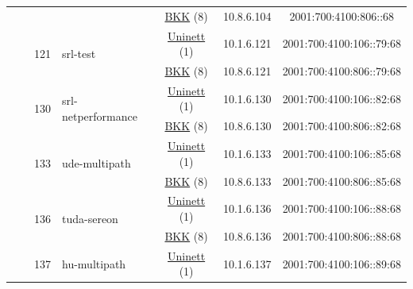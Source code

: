 \begin{small}
\begin{center}
\begin{longtable}{|c|c|c|c|c|c|c|c|}
  &  & \multicolumn{2}{|c|}{} & \multicolumn{2}{|c|}{\tiny{\href{http://bkk.no}{BKK} (8)}} & \tiny{10.8.6.104} & \tiny{2001:700:4100:806::68} \\* \cline{3-3}\cline{4-4}\cline{5-5}\cline{6-6}\cline{7-7}\cline{8-8}
  &  & \multirow{2}{*}{\tiny{121}} & \multicolumn{1}{|l|}{\multirow{2}{*}{\tiny{srl-test}}} & \multicolumn{2}{|c|}{\tiny{\href{https://www.uninett.no}{Uninett} (1)}} & \tiny{10.1.6.121} & \tiny{2001:700:4100:106::79:68} \\* \cline{5-5}\cline{6-6}\cline{7-7}\cline{8-8}
  &  &  &  & \multicolumn{2}{|c|}{\tiny{\href{http://bkk.no}{BKK} (8)}} & \tiny{10.8.6.121} & \tiny{2001:700:4100:806::79:68} \\* \cline{3-3}\cline{4-4}\cline{5-5}\cline{6-6}\cline{7-7}\cline{8-8}
  &  & \multirow{2}{*}{\tiny{130}} & \multicolumn{1}{|l|}{\multirow{2}{*}{\tiny{srl-netperformance}}} & \multicolumn{2}{|c|}{\tiny{\href{https://www.uninett.no}{Uninett} (1)}} & \tiny{10.1.6.130} & \tiny{2001:700:4100:106::82:68} \\* \cline{5-5}\cline{6-6}\cline{7-7}\cline{8-8}
  &  &  &  & \multicolumn{2}{|c|}{\tiny{\href{http://bkk.no}{BKK} (8)}} & \tiny{10.8.6.130} & \tiny{2001:700:4100:806::82:68} \\* \cline{3-3}\cline{4-4}\cline{5-5}\cline{6-6}\cline{7-7}\cline{8-8}
  &  & \multirow{2}{*}{\tiny{133}} & \multicolumn{1}{|l|}{\multirow{2}{*}{\tiny{ude-multipath}}} & \multicolumn{2}{|c|}{\tiny{\href{https://www.uninett.no}{Uninett} (1)}} & \tiny{10.1.6.133} & \tiny{2001:700:4100:106::85:68} \\* \cline{5-5}\cline{6-6}\cline{7-7}\cline{8-8}
  &  &  &  & \multicolumn{2}{|c|}{\tiny{\href{http://bkk.no}{BKK} (8)}} & \tiny{10.8.6.133} & \tiny{2001:700:4100:806::85:68} \\* \cline{3-3}\cline{4-4}\cline{5-5}\cline{6-6}\cline{7-7}\cline{8-8}
  &  & \multirow{2}{*}{\tiny{136}} & \multicolumn{1}{|l|}{\multirow{2}{*}{\tiny{tuda-sereon}}} & \multicolumn{2}{|c|}{\tiny{\href{https://www.uninett.no}{Uninett} (1)}} & \tiny{10.1.6.136} & \tiny{2001:700:4100:106::88:68} \\* \cline{5-5}\cline{6-6}\cline{7-7}\cline{8-8}
  &  &  &  & \multicolumn{2}{|c|}{\tiny{\href{http://bkk.no}{BKK} (8)}} & \tiny{10.8.6.136} & \tiny{2001:700:4100:806::88:68} \\* \cline{3-3}\cline{4-4}\cline{5-5}\cline{6-6}\cline{7-7}\cline{8-8}
  &  & \multirow{2}{*}{\tiny{137}} & \multicolumn{1}{|l|}{\multirow{2}{*}{\tiny{hu-multipath}}} & \multicolumn{2}{|c|}{\tiny{\href{https://www.uninett.no}{Uninett} (1)}} & \tiny{10.1.6.137} & \tiny{2001:700:4100:106::89:68} \\* \cline{5-5}\cline{6-6}\cline{7-7}\cline{8-8}

\end{longtable}
\end{center}
\end{small}
